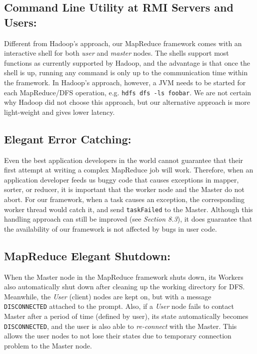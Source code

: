 \documentclass{article} %
\begin{document}
\subsection{Command Line Utility at RMI Servers and Users:}
    \par\qquad Different from Hadoop's approach, our MapReduce framework comes with an interactive shell for both \emph{user} and \emph{master} nodes. The shells support most functions as currently supported by Hadoop, and the advantage is that once the shell is up, running any command is only up to the communication time within the framework. In Hadoop's approach, however, a JVM needs to be started for each MapReduce/DFS operation, e.g. \texttt{hdfs dfs -ls foobar}. We are not certain why Hadoop did not choose this approach, but our alternative approach is more light-weight and gives lower latency.
\subsection{Elegant Error Catching:}
    \par\qquad Even the best application developers in the world cannot guarantee that their first attempt at writing a complex MapReduce job will work. Therefore, when an application developer feeds us buggy code that causes exceptions in mapper, sorter, or reducer, it is important that the worker node and the Master do not abort. For our framework, when a task causes an exception, the corresponding worker thread would catch it, and send \texttt{taskFailed} to the Master. Although this handling approach can still be improved (see \emph{Section 8.3}), it does guarantee that the availability of our framework is not affected by bugs in user code.
\subsection{MapReduce Elegant Shutdown:}
    \par\qquad When the Master node in the MapReduce framework shuts down, its Workers also automatically shut down after cleaning up the working directory for DFS. Meanwhile, the \emph{User} (client) nodes are kept on, but with a message \texttt{DISCONNECTED} attached to the prompt. Also, if a \emph{User} node fails to contact Master after a period of time (defined by user), its state automatically becomes \texttt{DISCONNECTED}, and the user is also able to \emph{re-connect} with the Master. This allows the user nodes to not lose their states due to temporary connection problem to the Master node.
\end{document}
